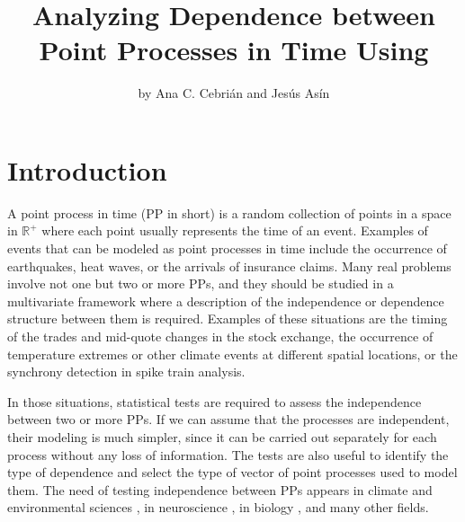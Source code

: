 \title{Analyzing Dependence between Point Processes in Time Using }
\author{by Ana C. Cebrián and Jesús Asín}

\maketitle


	\section{Introduction}


A point process  in time (PP in short) is a random collection of points  in a space in $\mathbb{R}^+$  where each point  usually represents the time of an event.  Examples of  events that can be
modeled as point processes in time include the occurrence of earthquakes, heat waves, or  the arrivals of insurance claims.
Many  real problems  involve not one but two or more   PPs, and they should be studied in a multivariate  framework where a  description  of the independence or dependence structure between them is required.   Examples of these situations are the timing of the trades and mid-quote changes  in the stock exchange,  the occurrence of temperature extremes or other climate events at different spatial locations, or  the synchrony detection in spike train analysis.

In those situations, statistical tests are required to assess the independence between two or more PPs.  If we can assume  that the  processes are independent, their modeling is much simpler, since it can be carried out separately for each process without any loss of information.  The  tests are also useful  to identify the type of dependence and  select  the type of vector of point processes  used to model them.    The need  of  testing independence  between PPs appears in   climate and environmental sciences   \citep{Cronie16, Abaurrea15}, in  neuroscience  \citep{Tuleau14, Albert15}, in  biology \citep{Myllymaki17},  and many other fields.


